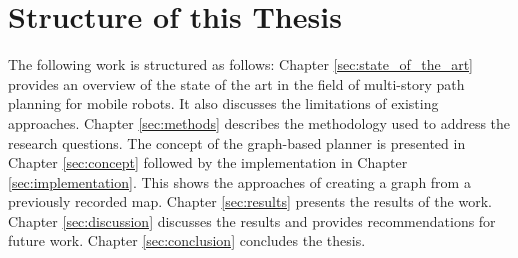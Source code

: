 \section{Structure of this Thesis}
\label{sec:structure}
The following work is structured as follows: Chapter \ref{sec:state_of_the_art} provides an overview of the state of the art in the field of multi-story path planning for mobile robots. It also discusses the limitations of existing approaches. Chapter \ref{sec:methods} describes the methodology used to address the research questions. The concept of the graph-based planner is presented in Chapter \ref{sec:concept} followed by the implementation in Chapter \ref{sec:implementation}. This shows the approaches of creating a graph from a previously recorded map. Chapter \ref{sec:results} presents the results of the work. Chapter \ref{sec:discussion} discusses the results and provides recommendations for future work. Chapter \ref{sec:conclusion} concludes the thesis.
